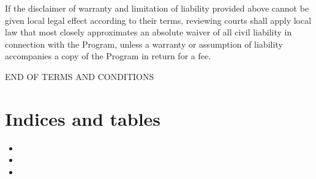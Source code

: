 \documentclass[letterpaper,10pt,english]{sphinxmanual}
\begin{document}
If the disclaimer of warranty and limitation of liability provided
above cannot be given local legal effect according to their terms,
reviewing courts shall apply local law that most closely approximates
an absolute waiver of all civil liability in connection with the
Program, unless a warranty or assumption of liability accompanies a
copy of the Program in return for a fee.

END OF TERMS AND CONDITIONS


\chapter{Indices and tables}
\label{\detokenize{index:indices-and-tables}}\begin{itemize}
\item {} 

\item {} 

\item {} 

\end{itemize}



\renewcommand{\indexname}{Index}
\printindex
\end{document}
